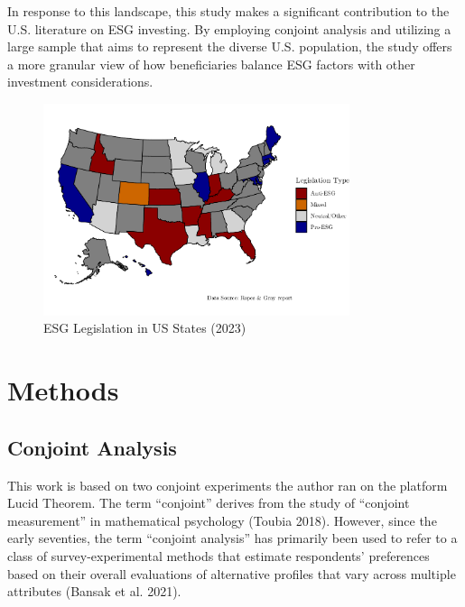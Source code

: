 \documentclass[
  12pt,
]{article}
\begin{document}
In response to this landscape, this study makes a significant contribution to the U.S. literature on ESG investing. By employing conjoint analysis and utilizing a large sample that aims to represent the diverse U.S. population, the study offers a more granular view of how beneficiaries balance ESG factors with other investment considerations.

\begin{figure}

{\centering \includegraphics[width=0.8\textwidth]{manuscript_files/figure-latex/mapplot-1} 

}

\caption{ESG Legislation in US States (2023)}\label{fig:mapplot}
\end{figure}

\hypertarget{methods}{%
\section{Methods}\label{methods}}

\hypertarget{conjoint-analysis}{%
\subsection{Conjoint Analysis}\label{conjoint-analysis}}

This work is based on two conjoint experiments the author ran on the platform Lucid Theorem. The term ``conjoint'' derives from the study of ``conjoint measurement'' in mathematical psychology (Toubia 2018). However, since the early seventies, the term ``conjoint analysis'' has primarily been used to refer to a class of survey-experimental methods that estimate respondents' preferences based on their overall evaluations of alternative profiles that vary across multiple attributes (Bansak et al. 2021).
\end{document}
